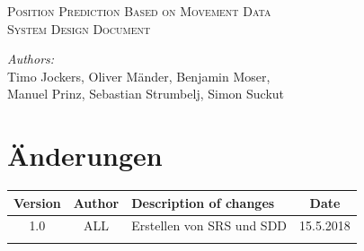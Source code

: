 \documentclass[12pt]{article} %
\begin{document}


\begin{titlepage}

\newcommand{\HRule}{\rule{\linewidth}{0.5mm}} %

\center %

\textsc{\Large Position Prediction Based on Movement Data}\\[0.5cm] %
\textsc{\large System Design Document}\\[0.5cm] %

\vfill

\emph{Authors:}\\
Timo Jockers, Oliver Mänder, Benjamin Moser, \\
Manuel Prinz, Sebastian Strumbelj, Simon Suckut

\vfill %

\end{titlepage}


\tableofcontents %

\newpage %


\section{Änderungen}


\begin{tabular}{|c|c|p{10cm}|c|}
\hline
Version & Author & Description of changes & Date \\ \hline\hline

1.0 & ALL & Erstellen von SRS und SDD & 15.5.2018 \\\hline
	&	&	&	\\\hline

\end{tabular}
\end{document}

